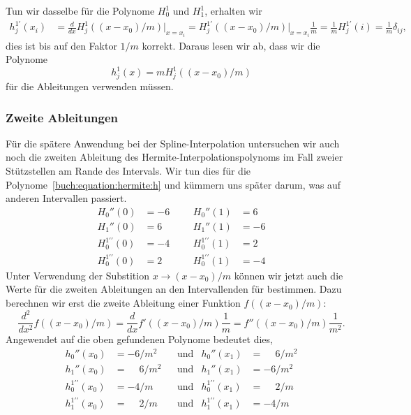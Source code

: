 Tun wir dasselbe für die Polynome $H_0^1$ und $H_1^1$, erhalten wir
\begin{align*}
h_j^{1\prime}(x_i)
&=
\frac{d}{dx} H_j^1((x-x_0)/m) \bigg|_{x=x_i}
=
H_j^{1\prime}((x-x_0)/m)\bigg|_{x=x_i} \frac{1}{m}
=
\frac1m
H_j^{1\prime}(i)
=
\frac1m\delta_{ij},
\end{align*}
dies ist bis auf den Faktor $1/m$ korrekt.
Daraus lesen wir ab, dass wir die Polynome
\[
h_j^1(x)
=
mH_j^1((x-x_0)/m)
\]
für die Ableitungen verwenden müssen.

\subsubsection{Zweite Ableitungen}
Für die spätere Anwendung bei der Spline-Interpolation untersuchen
wir auch noch die zweiten Ableitung des Hermite-Interpolationspolynoms
im Fall zweier Stützstellen am Rande des Intervals.
Wir tun dies für die Polynome~\eqref{buch:equation:hermite:h}
und kümmern uns später darum, was auf anderen Intervallen passiert.
\[
\begin{aligned}
H_0''(0)                &= -6 &&&  H_0''(1)                &=  6
\\
H_1''(0)                &=  6 &&&  H_1''(1)                &= -6
\\
H_0^{1\prime\prime}(0)  &= -4 &&&  H_0^{1\prime\prime}(1)  &=  2
\\
H_0^{1\prime\prime}(0)  &=  2 &&&  H_0^{1\prime\prime}(1)  &= -4
\end{aligned}
\]
Unter Verwendung der Substition $x\to (x-x_0)/m$ können wir jetzt auch
die Werte für die zweiten Ableitungen an den Intervallenden für bestimmen.
Dazu berechnen wir erst die zweite Ableitung einer Funktion $f((x-x_0)/m)$:
\[
\frac{d^2}{dx^2} f((x-x_0)/m)
=
\frac{d}{dx} f'((x-x_0)/m) \frac1m
=
f''((x-x_0)/m) \frac1{m^2}.
\]
Angewendet auf die oben gefundenen Polynome bedeutet dies, 
\[
\begin{aligned}
h_0''(x_0) &=          - 6/m^2
&&\text{und}&
h_0''(x_1) &= \phantom{-}6/m^2 \\
h_1''(x_0) &= \phantom{-}6/m^2
&&\text{und}&
h_1''(x_1) &=          - 6/m^2 \\
h_0^{1\prime\prime}(x_0) &=           -4/m
&&\text{und}&
h_0^{1\prime\prime}(x_1) &= \phantom{-}2/m \\
h_1^{1\prime\prime}(x_0) &= \phantom{-}2/m
&&\text{und}&
h_1^{1\prime\prime}(x_1) &= -4/m 
\end{aligned}
\]






